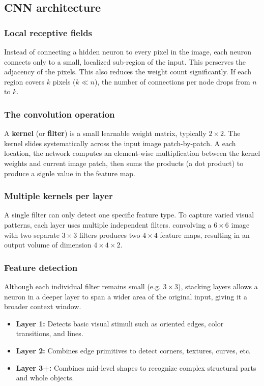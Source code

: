 \documentclass[11pt]{article}
\begin{document}
\subsection{CNN architecture}
\subsubsection{Local receptive fields}
Instead of connecting a hidden neuron to every pixel in the image, each neuron connects only to a small, localized sub-region of the input.
This perserves the adjacency of the pixels. This also reduces the weight count significantly. If each region covers $k$ pixels ($k\ll n$), the number of connections per node drops from $n$ to $k$.
\subsubsection{The convolution operation}
A \textbf{kernel} (or \textbf{filter}) is a small learnable weight matrix, typically $2\times 2$. 
The kernel slides systematically across the input image patch-by-patch. A each location, the network computes an element-wise multiplication between the kernel weights and current image patch, then sums the products (a dot product) to produce a signle value in the feature map.
\subsubsection{Multiple kernels per layer}
A single filter can only detect one specific feature type. To capture varied visual patterns, each layer uses multiple independent filters.
convolving a $6\times 6$ image with two separate $3\times 3$ filters produces two $4\times 4$ feature maps, resulting in an output volume of dimension $4\times 4\times 2$.
\subsubsection{Feature detection}
Although each individual filter remains small (e.g. $3\times 3$), stacking layers allows a neuron in a deeper layer to span a wider area of the original input, giving it a broader context window.
\begin{itemize}
    \item \textbf{Layer 1:} Detects basic visual stimuli such as oriented edges, color transitions, and lines.
    \item \textbf{Layer 2:} Combines edge primitives to detect corners, textures, curves, etc.
    \item \textbf{Layer 3+:} Combines mid-level shapes to recognize complex structural parts and whole objects.
\end{itemize}
\end{document}
